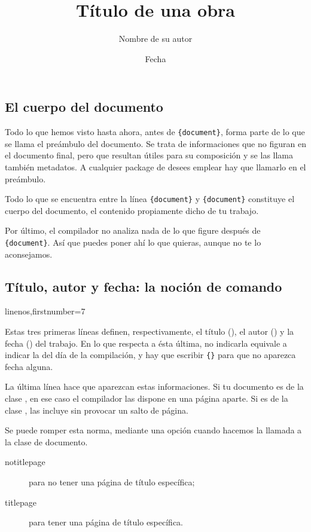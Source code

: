 \subsection{El cuerpo del documento}

Todo lo que hemos visto hasta ahora, antes de \verb|{document}|, forma parte de lo que se llama el preámbulo del documento.\label{preambule} Se trata de informaciones que no figuran en el documento final, pero que resultan útiles para su composición y se las llama también metadatos. A cualquier package de desees emplear hay que llamarlo en el preámbulo.

Todo lo que se encuentra entre la línea \verb|{document}| y \verb|{document}| constituye el cuerpo del documento, el contenido propiamente dicho de tu trabajo.

Por último, el compilador no analiza nada de lo que figure después de \verb|{document}|. Así que puedes poner ahí lo que quieras, aunque no te lo aconsejamos.

\subsection{Título, autor y fecha: la noción de comando}\label{notioncommande}

\begin{latexcode*}{linenos,firstnumber=7}
\title{Título de una obra}
\author{Nombre de su autor}
\date{Fecha}
\maketitle
\end{latexcode*}

Estas tres primeras líneas definen, respectivamente, el título (), el autor () y la fecha () del trabajo. En lo que respecta a ésta última, no indicarla equivale a indicar la del día de la compilación, y hay que escribir \verb|{}| para que no aparezca fecha alguna.

La última línea hace que aparezcan estas informaciones. Si tu documento es de la clase , en ese caso el compilador las dispone en una página aparte. Si es de la clase , las incluye sin provocar un salto de página.

Se puede romper esta norma, mediante una opción cuando hacemos la llamada a la clase de documento.
\begin{description}
\item[notitlepage] para no tener una página de título específica;
\item[titlepage] para tener una página de título específica.
\end{description}

